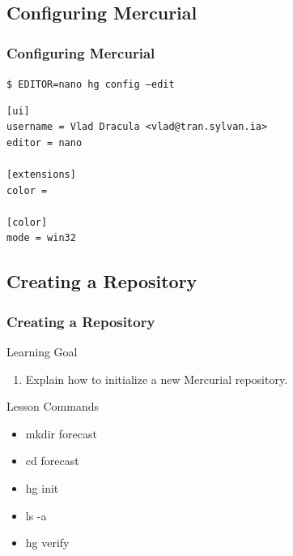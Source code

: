 \documentclass{beamer}
\begin{document}
\subsection*{Configuring Mercurial}
\begin{frame}[fragile]
\frametitle{Configuring Mercurial}

\texttt{\$ EDITOR=nano hg config --edit}

\begin{verbatim}
[ui]
username = Vlad Dracula <vlad@tran.sylvan.ia>
editor = nano

[extensions]
color =

[color]
mode = win32
\end{verbatim}

\end{frame}


\subsection*{Creating a Repository}
\begin{frame}
\frametitle{Creating a Repository}
\begin{block}{Learning Goal}
\begin{enumerate}
\item Explain how to initialize a new Mercurial repository.
\end{enumerate}
\end{block}

\begin{block}{Lesson Commands}
\begin{multicols}{2}
\begin{itemize}
\item mkdir forecast
\item cd forecast
\item hg init
\item ls -a
\item hg verify
\end{itemize}
\end{multicols}
\end{block}
\end{frame}
\end{document}
